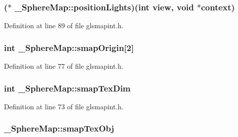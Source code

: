 \hypertarget{struct___sphere_map_ae696630b2f422031807c44e63b0f55a9}{
\subsubsection[{position\-Lights}]{($\ast$ \-\_\-\-Sphere\-Map\-::position\-Lights)(int view, {\bf void} $\ast${\bf context})}}\label{struct___sphere_map_ae696630b2f422031807c44e63b0f55a9}


Definition at line 89 of file glsmapint.\-h.

\hypertarget{struct___sphere_map_a41758a7953c63d3687e5981b4954bf9a}{
\subsubsection[{smap\-Origin}]{\setlength{\rightskip}{0pt plus 5cm}int \-\_\-\-Sphere\-Map\-::smap\-Origin\mbox{[}2\mbox{]}}}\label{struct___sphere_map_a41758a7953c63d3687e5981b4954bf9a}


Definition at line 77 of file glsmapint.\-h.

\hypertarget{struct___sphere_map_a59b4cf016e3fe520652cef083800789f}{
\subsubsection[{smap\-Tex\-Dim}]{\setlength{\rightskip}{0pt plus 5cm}int \-\_\-\-Sphere\-Map\-::smap\-Tex\-Dim}}\label{struct___sphere_map_a59b4cf016e3fe520652cef083800789f}


Definition at line 73 of file glsmapint.\-h.

\hypertarget{struct___sphere_map_a3f4b4ebc84435c496be900cca0103c99}{
\subsubsection[{smap\-Tex\-Obj}]{ \-\_\-\-Sphere\-Map\-::smap\-Tex\-Obj}}\label{struct___sphere_map_a3f4b4ebc84435c496be900cca0103c99}


